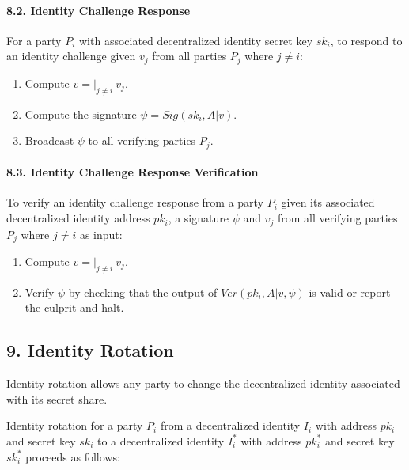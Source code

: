 \documentclass[
]{article}
\providecommand{\tightlist}{%
  \setlength{\itemsep}{0pt}\setlength{\parskip}{0pt}}
\begin{document}
\hypertarget{identity-challenge-response}{%
\paragraph{8.2. Identity Challenge
Response}\label{identity-challenge-response}}

For a party \(P_i\) with associated decentralized identity secret key
\(sk_i\), to respond to an identity challenge given \(v_j\) from all
parties \(P_j\) where \(j \neq i\):

\begin{enumerate}
\def\labelenumi{\arabic{enumi}.}
\tightlist
\item
  Compute \(v = | _{j \neq i} \: v_j\).
\item
  Compute the signature \(\psi = Sig(sk_i, A | v)\).
\item
  Broadcast \(\psi\) to all verifying parties \(P_j\).
\end{enumerate}

\hypertarget{identity-challenge-verification}{%
\paragraph{8.3. Identity Challenge Response
Verification}\label{identity-challenge-verification}}

To verify an identity challenge response from a party \(P_i\) given its
associated decentralized identity address \(pk_i\), a signature \(\psi\)
and \(v_j\) from all verifying parties \(P_j\) where \(j \neq i\) as
input:

\begin{enumerate}
\def\labelenumi{\arabic{enumi}.}
\tightlist
\item
  Compute \(v = | _{j \neq i} \: v_j\).
\item
  Verify \(\psi\) by checking that the output of
  \(Ver(pk_i, A | v, \psi)\) is valid or report the culprit and halt.
\end{enumerate}

\hypertarget{identity-rotation}{%
\subsection{9. Identity Rotation}\label{identity-rotation}}

Identity rotation allows any party to change the decentralized identity
associated with its secret share.

Identity rotation for a party \(P_i\) from a decentralized identity
\(I_i\) with address \(pk_i\) and secret key \(sk_i\) to a decentralized
identity \(I_i^ \ast\) with address \(pk_i^ \ast\) and secret key
\(sk_i^ \ast\) proceeds as follows:
\end{document}
